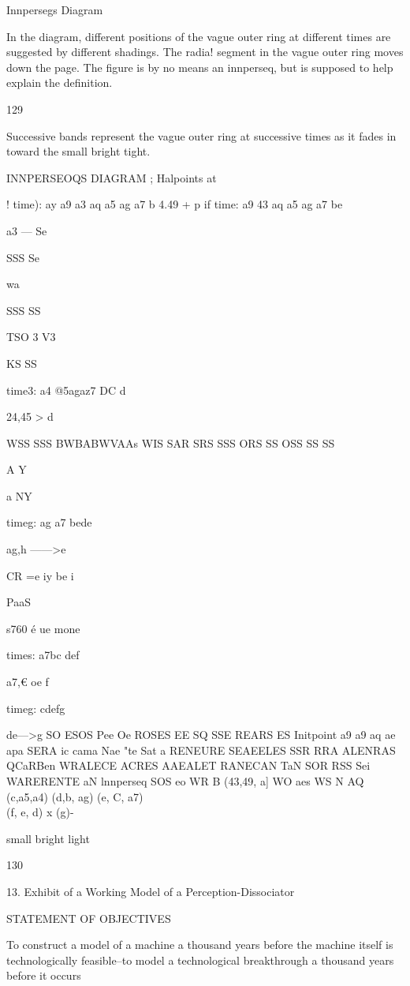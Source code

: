 \documentclass[10pt,twoside]{memoir}
\begin{document}
\begin{enumerate}
{\begin{enumerate}
\begin{sysrules}
\begin{sysrules}
\begin{sysrules}
\begin{sysrules}
{\begin{enumerate}
{{{Innpersegs Diagram 

In the diagram, different positions of the vague outer ring at different times 
are suggested by different shadings. The radia! segment in the vague outer 
ring moves down the page. The figure is by no means an innperseq, but is 
supposed to help explain the definition. 


129 


Successive bands represent the vague outer ring at successive times as it fades in toward the small bright tight. 


INNPERSEOQS DIAGRAM ; 
Halpoints at 


! time): ay a9 a3 aq a5 ag a7 b 
4.49 + p 
if time: a9 43 aq a5 ag a7 be 


a3 — Se 


SSS 
Se 


wa 


SSS SS 


TSO 3 
V3 


KS SS 


time3: a4 @5agaz7 DC d 


24,45 > d 


WSS SSS 
BWBABWVAAs 
WIS SAR SRS SSS ORS SS OSS SS SS 


A 
Y 


a 
NY 


timeg: ag a7 bede 


ag,h ——>e 


CR 
=e 
iy 
be 
i 


PaaS 


s760%
é ue 
mone 


times: a7bc def 


a7,€ oe f 


timeg: cdefg 


de—>g 
SO ESOS Pee Oe 
ROSES EE 
SQ 
SSE REARS ES Initpoint a9 a9 aq ae apa 
SERA ic cama Nae "te Sat a 
RENEURE SEAEELES 
SSR RRA 
ALENRAS QCaRBen 
WRALECE ACRES 
AAEALET RANECAN 
TaN 
SOR RSS Sei 
WARERENTE aN lnnperseq 
SOS eo 
WR B (43,49, a] 
WO aes 
WS N AQ (c,a5,a4) 
(d,b, ag) 
(e, C, a7) 
\\ (f, e, d) 
x (g)- 


small bright light 


130 


13. Exhibit of a Working Model of a Perception-Dissociator 


STATEMENT OF OBJECTIVES 


To construct a model of a machine a thousand years before the machine 
itself is technologically feasible--to model a technological breakthrough a 
thousand years before it occurs 


}}}
\end{enumerate}}
\end{sysrules}
\end{sysrules}
\end{sysrules}
\end{sysrules}
\end{enumerate}}
\end{enumerate}
\end{document}
